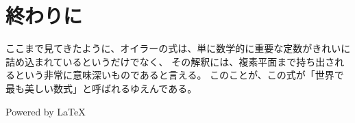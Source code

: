 \documentclass[12pt,a4paper,fleqn]{ltjsarticle}
\begin{document}
\section{終わりに}
ここまで見てきたように、オイラーの式は、単に数学的に重要な定数がきれいに詰め込まれているというだけでなく、
その解釈には、複素平面まで持ち出されるという非常に意味深いものであると言える。
このことが、この式が「世界で最も美しい数式」と呼ばれるゆえんである。

\vfill

\begin{flushright}
  Powered by \LaTeX
\end{flushright}
\end{document}
